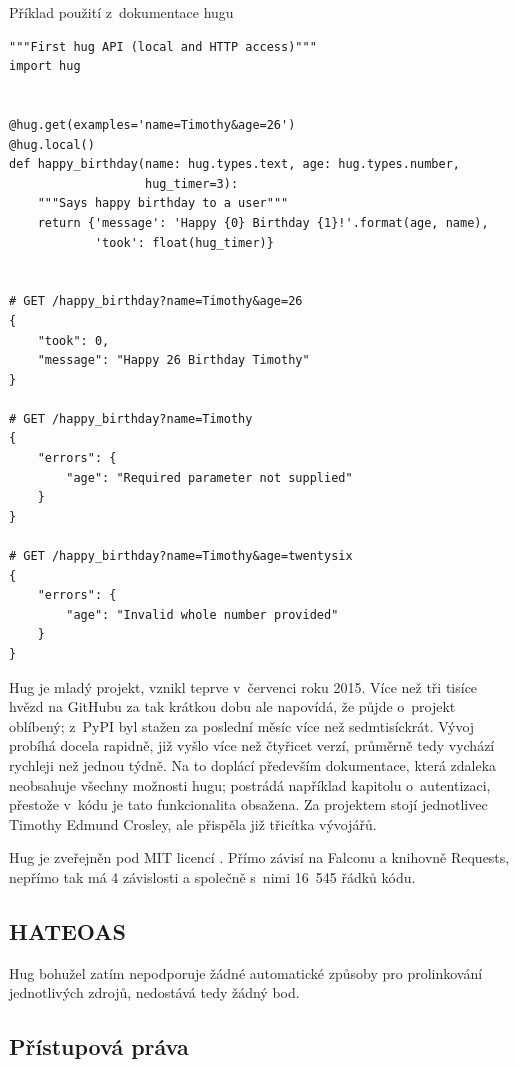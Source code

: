 \begin{listing}[htbp]
\caption{{\label{code:hug}Příklad použití z~dokumentace hugu \autocite{hugdoc}}}
\begin{verbatim}
"""First hug API (local and HTTP access)"""
import hug


@hug.get(examples='name=Timothy&age=26')
@hug.local()
def happy_birthday(name: hug.types.text, age: hug.types.number,
                   hug_timer=3):
    """Says happy birthday to a user"""
    return {'message': 'Happy {0} Birthday {1}!'.format(age, name),
            'took': float(hug_timer)}


# GET /happy_birthday?name=Timothy&age=26
{
    "took": 0,
    "message": "Happy 26 Birthday Timothy"
}

# GET /happy_birthday?name=Timothy
{
    "errors": {
        "age": "Required parameter not supplied"
    }
}

# GET /happy_birthday?name=Timothy&age=twentysix
{
    "errors": {
        "age": "Invalid whole number provided"
    }
}
\end{verbatim}
\end{listing}

Hug je mladý projekt, vznikl teprve v~červenci roku 2015. Více než tři tisíce hvězd na GitHubu za tak krátkou dobu ale napovídá, že půjde o~projekt oblíbený; z~PyPI byl stažen za poslední měsíc více než sedmtisíckrát. Vývoj probíhá docela rapidně, již vyšlo více než čtyřicet verzí, průměrně tedy vychází rychleji než jednou týdně. Na to doplácí především dokumentace, která zdaleka neobsahuje všechny možnosti hugu; postrádá například kapitolu o~autentizaci, přestože v~kódu je tato funkcionalita obsažena. Za projektem stojí jednotlivec Timothy Edmund Crosley, ale přispěla již třicítka vývojářů.

Hug je zveřejněn pod MIT licencí \autocite{MIT}. Přímo závisí na Falconu a knihovně Requests, nepřímo tak má 4 závislosti a společně s~nimi 16~545 řádků kódu.

\subsection{HATEOAS}\label{hateoas}

Hug bohužel zatím nepodporuje žádné automatické způsoby pro prolinkování jednotlivých zdrojů, nedostává tedy žádný bod.

\subsection{Přístupová práva}\label{pux159uxedstupovuxe1-pruxe1va}

